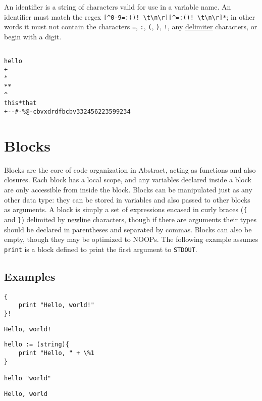\documentclass[letterpaper,titlepage]{scrreprt}
\begin{document}
An identifier is a string of characters valid for use in a variable name. An identifier must match the regex \lstinline{[^0-9=:()! \t\n\r][^=:()! \t\n\r]*}; in other words it must not contain the characters \lstinline{=}, \lstinline{:}, \lstinline{(}, \lstinline{)}, \lstinline{!}, any \hyperref[def:delimiter]{delimiter} characters, or begin with a digit.

\begin{lstlisting}[caption={Example identifiers},label=lst:identifiers]

hello
+
*
**
^
this*that
+--#-%@-cbvxdrdfbcbv332456223599234

\end{lstlisting}

\section{Blocks}
\label{sec:Blocks}

Blocks are the core of code organization in Abstract, acting as functions and also closures. Each block has a local scope, and any variables declared inside a block are only accessible from inside the block. Blocks can be manipulated just as any other data type: they can be stored in variables and also passed to other blocks as arguments. A block is simply a set of expressions encased in curly braces (\lstinline|{| and \lstinline|}|) delimited by \hyperref[def:newline]{newline} characters, though if there are arguments their types should be declared in parentheses and separated by commas. Blocks can also be empty, though they may be optimized to NOOPs. The following example assumes \lstinline{print} is a block defined to print the first argument to \lstinline{STDOUT}.

\subsection{Examples}
\label{subsec:BlockExamples}

\begin{lstlisting}[caption={Example block},label=lst:exampleblock]
{
	print "Hello, world!"
}!
\end{lstlisting}
\begin{lstlisting}[caption={Example block output},label=lst:exampleblockoutput]
Hello, world!
\end{lstlisting}

\begin{lstlisting}[caption={Example block with arguments},label=lst:exampleblockarg]
hello := (string){
	print "Hello, " + \%1
}

hello "world"
\end{lstlisting}
\begin{lstlisting}[caption={Example block with arguments output},label=lst:exampleblockargoutput]
Hello, world
\end{lstlisting}
\end{document}
